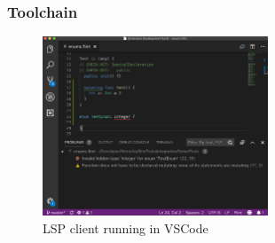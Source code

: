 \documentclass{beamer}
\begin{document}
\begin{frame}
\frametitle{Toolchain}
\begin{figure}
    \centering
    \includegraphics[width=0.6\textwidth]{figures/lsp-use.png}
    \\ LSP client running in VSCode
    \label{fig:my_label}
\end{figure}
\end{frame}
\end{document}
